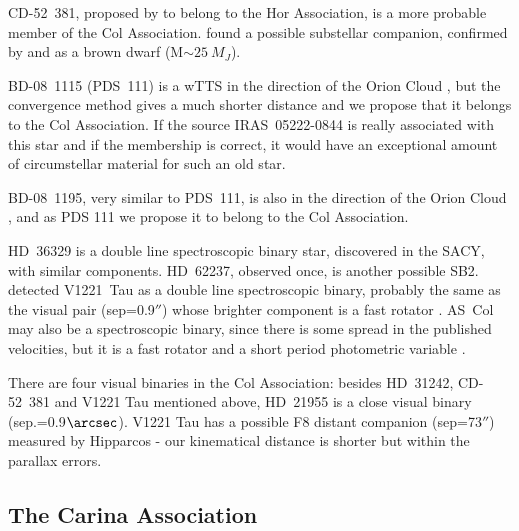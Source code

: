 \documentclass[11pt,twoside]{book}
\begin{document}
CD-52~381, proposed by \citet{torres00} to belong to the Hor Association,
is a more probable member of the Col Association.
\citet{chauvin03} found a possible substellar companion,
confirmed by \citet{neuh04} and \citet{chauvin05b} as a brown dwarf (M$\sim25~M_{J}$).

BD-08~1115 (PDS~111) is a wTTS in the direction of the Orion Cloud
\citep{Torres1995}, but the convergence method gives a much shorter
distance and we propose that it belongs to the Col Association.  If
the source IRAS~05222-0844 is really associated with this star and if
the membership is correct, it would have an exceptional amount of
circumstellar material for such an old star.

BD-08~1195, very similar to PDS~111, is also in the direction of the
Orion Cloud \citep{Alcala00}, and as PDS 111 we propose it to
belong to the Col Association.

HD~36329 is a double line spectroscopic binary star, discovered in the
SACY, with similar components. HD~62237, observed once, is another
possible SB2. \citet{zickgraf05} detected V1221~Tau as a double line
spectroscopic binary, probably the same as the visual pair
(sep=0.9$''$) whose brighter component is a fast rotator
\citep{cutispoto99}. AS~Col may also be a spectroscopic binary, since
there is some spread in the published velocities, but it is a fast
rotator and a short period photometric variable \citep{cutispoto99}.

There are four visual binaries in the Col Association: besides
HD~31242, CD-52~381 and V1221 Tau mentioned above, HD~21955 is a close
visual binary (sep.=0.9$\arcsec$). V1221 Tau has a possible F8 distant
companion (sep=73$''$) measured by Hipparcos - our kinematical
distance is shorter but within the parallax errors.


\subsection{The Carina Association}
\end{document}
